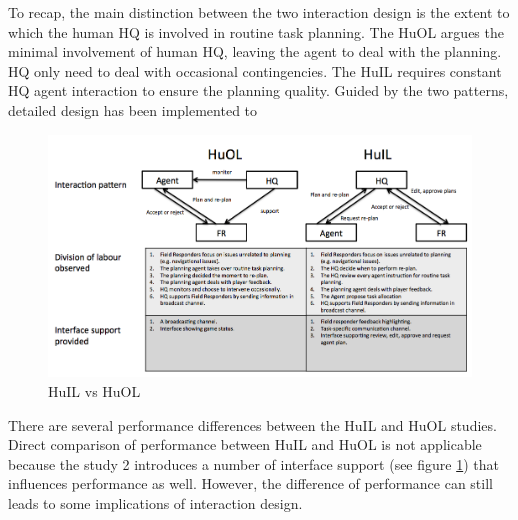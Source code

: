 To recap, the main distinction between the two interaction design is the extent to which the human HQ is involved in routine task planning. The HuOL  argues the minimal involvement of human HQ, leaving the agent to deal with the planning. HQ only need to deal with occasional contingencies. The HuIL requires constant HQ agent interaction to ensure the planning quality. Guided by the two patterns, detailed design has been implemented to \\

\begin{figure}[h]
  \centering
  \includegraphics[width=1\textwidth]{img/conclusion/huilvshuol}
  \caption{HuIL vs HuOL}
  \label{fig:huilvshuol}
\end{figure}


There are several performance differences between the HuIL and HuOL studies. Direct comparison of performance between HuIL and HuOL is not applicable because the study 2 introduces a number of interface support (see figure \ref{fig:huilvshuol}) that influences performance as well. However, the difference of performance can still leads to some implications of interaction design.\\

